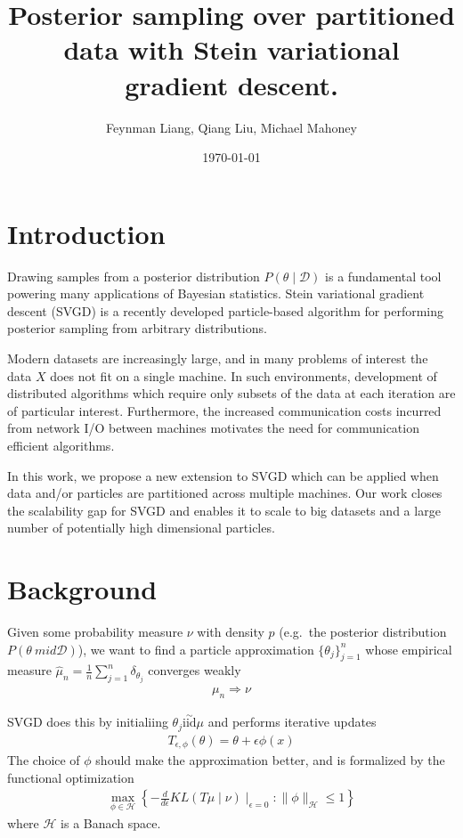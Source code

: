 \documentclass{article}
\title{Posterior sampling over partitioned data with Stein variational gradient descent.}
\author{Feynman Liang, Qiang Liu, Michael Mahoney}
\date{\today}
\newcommand{\cD}{\mathcal{D}}
\newcommand{\cH}{\mathcal{H}}
\begin{document}
\maketitle

\section{Introduction}

Drawing samples from a posterior distribution $P(\theta \mid \mathcal{D})$ is a fundamental
tool powering many applications of Bayesian statistics.
Stein variational gradient descent (SVGD) \cite{liu2016stein} is a recently developed
particle-based algorithm for performing posterior sampling from arbitrary distributions.

Modern datasets are increasingly large, and in many problems of interest the data $X$
does not fit on a single machine. In such environments, development of distributed algorithms
which require only subsets of the data at each iteration are of particular interest. Furthermore,
the increased communication costs incurred from network I/O between machines motivates
the need for communication efficient algorithms.

In this work, we propose a new extension to SVGD which can be applied when data
and/or particles are partitioned across multiple machines. Our work closes the scalability
gap for SVGD and enables it to scale to big datasets and a large number of potentially high
dimensional particles.


\section{Background}
\label{sec:background}

Given some probability measure $\nu$ with density $p$ (e.g.\ the posterior distribution $P(\theta\ mid \cD)$),
we want to find a particle approximation $\{\theta_j\}_{j=1}^n$ whose empirical
measure $\hat\mu_n = \frac{1}{n}\sum^{n}_{j=1} \delta_{\theta_j}$ converges
weakly
\begin{align}
    \mu_n \Rightarrow \nu
\end{align}

SVGD does this by initialiing $\theta_j \overset{\sim}{\text{iid}} \mu$ and performs iterative updates
\begin{align}
    T_{\epsilon, \phi}(\theta) = \theta + \epsilon \phi(x)
\end{align}
The choice of $\phi$ should make the approximation better, and is formalized by the functional optimization
\begin{align}
    \max_{\phi \in \cH} \left\{
        - \frac{d}{d\epsilon} KL(T \mu \mid \nu ) \mid_{\epsilon = 0} : \|\phi\|_\cH \leq 1
    \right\}
\end{align}
where $\cH$ is a Banach space.
\end{document}
